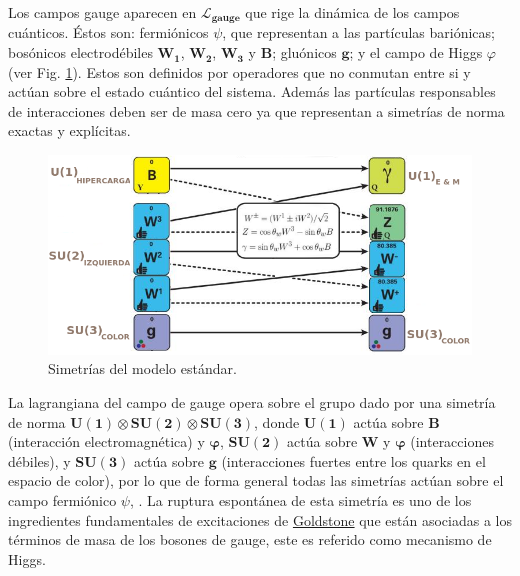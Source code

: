 Los campos gauge aparecen en $\mathcal{L}_{\mathbf{gauge}}$ que rige la dinámica de los campos cuánticos. Éstos son: fermiónicos $\psi$, que representan a las partículas bariónicas; bosónicos electrodébiles $\mathbf{W_1}$, $\mathbf{W_2} $, $\mathbf{W_3}$ y $\mathbf{B}$; gluónicos $\mathbf{g}$; y el campo de Higgs $\varphi$ (ver Fig. \ref{simetrias}). Estos son definidos por operadores que no conmutan entre si y actúan sobre el estado cuántico del sistema. Además las partículas responsables de interacciones deben ser de masa cero ya que representan a simetrías de norma exactas y explícitas.
 
\begin{figure}[!t]
\centering
\includegraphics[width=1\textwidth]{Fisica_de_Particulas/imagenes/simetria0.png}
\caption[Simetrías del modelo estándar]{Simetrías del modelo estándar.\footnotemark}
\label{simetrias}
\end{figure}

La lagrangiana del campo de gauge opera sobre el grupo dado por una simetría de norma $\mathbf{U(1) \otimes SU(2) \otimes SU(3)}$, donde $\mathbf{U(1)}$ actúa sobre $\mathbf{B}$ (interacción electromagnética) y $\mathbf{\varphi}$, $\mathbf{SU(2)}$ actúa sobre $\mathbf{W}$ y $\mathbf{\varphi}$ (interacciones débiles), y $\mathbf{SU(3)}$ actúa sobre $\mathbf{g}$ (interacciones fuertes entre los quarks en el espacio de color), por lo que de forma general todas las simetrías actúan sobre el campo fermiónico $\psi$, \citep{ME}.
La ruptura espontánea de esta simetría es uno de los ingredientes fundamentales de excitaciones de \href{https://es.wikipedia.org/wiki/Bos\%C3\%B3n\_de\_Goldstone}{Goldstone} que están asociadas a los términos de masa de los bosones de gauge, este es referido como mecanismo de Higgs.

